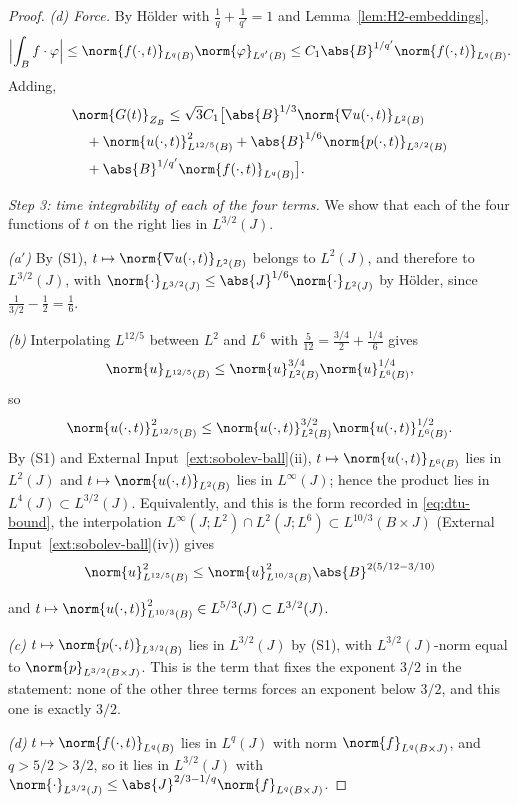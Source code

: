 \documentclass[11pt,reqno]{amsart}
\begin{document}
\begin{proof}
\emph{(d) Force.} By H\"older with $\tfrac1q+\tfrac1{q'}=1$ and
Lemma~\ref{lem:H2-embeddings},
\[
  \Bigl|\int_{B}f\cdot\varphi\Bigr|
  \le\norm{f(\cdot,t)}_{L^{q}(B)}\norm{\varphi}_{L^{q'}(B)}
  \le C_{1}\abs{B}^{1/q'}\norm{f(\cdot,t)}_{L^{q}(B)} .
\]
Adding,
\[
\begin{aligned}
&\norm{G(t)}_{Z_{B}}\le\sqrt{3}C_{1}\bigl[\abs{B}^{1/3}\norm{\nabla u(\cdot,t)}_{L^{2}(B)}
\\ &\quad+\norm{u(\cdot,t)}_{L^{12/5}(B)}^{2}+\abs{B}^{1/6}\norm{p(\cdot,t)}_{L^{3/2}(B)}
\\ &\quad+\abs{B}^{1/q'}\norm{f(\cdot,t)}_{L^{q}(B)}\bigr].\end{aligned}\]

\emph{Step 3: time integrability of each of the four terms.} We show that each
of the four functions of $t$ on the right lies in $L^{3/2}(J)$.

\emph{(a$'$)} By (S1), $t\mapsto\norm{\nabla u(\cdot,t)}_{L^{2}(B)}$ belongs
to $L^{2}(J)$, and therefore to $L^{3/2}(J)$, with
$\norm{\cdot}_{L^{3/2}(J)}\le\abs{J}^{1/6}\norm{\cdot}_{L^{2}(J)}$ by H\"older,
since $\tfrac1{3/2}-\tfrac12=\tfrac16$.

\emph{(b)} Interpolating $L^{12/5}$ between $L^{2}$ and $L^{6}$ with
$\tfrac{5}{12}=\tfrac{3/4}{2}+\tfrac{1/4}{6}$ gives
\[
\norm{u}_{L^{12/5}(B)}\le\norm{u}_{L^{2}(B)}^{3/4}\norm{u}_{L^{6}(B)}^{1/4}
,
\]
so
\[
\norm{u(\cdot,t)}_{L^{12/5}(B)}^{2}
 \le\norm{u(\cdot,t)}_{L^{2}(B)}^{3/2}\norm{u(\cdot,t)}_{L^{6}(B)}^{1/2}
.
\]
By (S1) and External Input~\ref{ext:sobolev-ball}(ii),
$t\mapsto\norm{u(\cdot,t)}_{L^{6}(B)}$ lies in $L^{2}(J)$ and
$t\mapsto\norm{u(\cdot,t)}_{L^{2}(B)}$ lies in $L^{\infty}(J)$; hence the
product lies in $L^{4}(J)\subset L^{3/2}(J)$. Equivalently, and this is the form
recorded in \eqref{eq:dtu-bound}, the interpolation
$L^{\infty}(J;L^{2})\cap L^{2}(J;L^{6})\subset L^{10/3}(B\times J)$
(External Input~\ref{ext:sobolev-ball}(iv)) gives
\[
\norm{u}^{2}_{L^{12/5}(B)}\le\norm{u}^{2}_{L^{10/3}(B)}\abs{B}^{2(5/12-3/10)}
\]

and $t\mapsto\norm{u(\cdot,t)}^{2}_{L^{10/3}(B)}\in L^{5/3}(J)\subset L^{3/2}(J)$.

\emph{(c)} $t\mapsto\norm{p(\cdot,t)}_{L^{3/2}(B)}$ lies in $L^{3/2}(J)$ by
(S1), with $L^{3/2}(J)$-norm equal to $\norm{p}_{L^{3/2}(B\times J)}$. This is
the term that fixes the exponent $3/2$ in the statement: none of the other three
terms forces an exponent below $3/2$, and this one is exactly $3/2$.

\emph{(d)} $t\mapsto\norm{f(\cdot,t)}_{L^{q}(B)}$ lies in $L^{q}(J)$ with norm
$\norm{f}_{L^{q}(B\times J)}$, and $q>5/2>3/2$, so it lies in $L^{3/2}(J)$ with
$\norm{\cdot}_{L^{3/2}(J)}\le\abs{J}^{2/3-1/q}\norm{f}_{L^{q}(B\times J)}$.


\end{proof}
\end{document}
